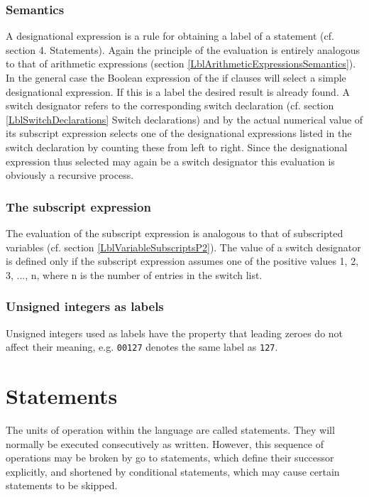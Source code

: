 \documentclass[a4paper,11pt]{article}
\begin{document}
\subsubsection{Semantics}
\label{LblDesignationalExpressionsSemantics}

A designational expression is a rule for obtaining a label of a
statement (cf. section 4.  Statements).  Again the principle of the
evaluation is entirely analogous to that of arithmetic expressions
(section \ref{LblArithmeticExpressionsSemantics}).  In the general
case the Boolean expression of the if clauses will select a simple
designational expression.  If this is a label the desired result is
already found.  A switch designator refers to the corresponding
switch declaration (cf. section \ref{LblSwitchDeclarations} Switch
declarations) and by the actual numerical value of its subscript
expression selects one of the designational expressions listed in the
switch declaration by counting these from left to right.  Since the
designational expression thus selected may again be a switch
designator this evaluation is obviously a recursive process.

\subsubsection{The subscript expression}

The evaluation of the subscript expression is analogous to that of
subscripted variables (cf. section \ref{LblVariableSubscriptsP2}).
The value of a switch designator is defined only if the subscript
expression assumes one of the positive values 1, 2, 3, ..., n, where n
is the number of entries in the switch list.

\subsubsection{Unsigned integers as labels}

Unsigned integers used as labels have the property that leading zeroes
do not affect their meaning, e.g. \texttt{00127} denotes the same
label as \texttt{127}.



\section{Statements}
\label{LblStatements}


The units of operation within the language are called statements.
They will normally be executed consecutively as written.  However,
this sequence of operations may be broken by go to statements, which
define their successor explicitly, and shortened by conditional
statements, which may cause certain statements to be skipped.
\end{document}
